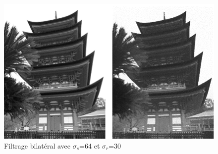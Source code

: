 \documentclass[twoside,UTF8]{EPURapport}
\begin{document}
\begin{figure}[H]
	\begin{center} 
		\includegraphics[]{images/IM088_64_30.png} 
	\end{center} 
	\caption{Filtrage bilatéral avec $\sigma_s$=64 et $\sigma_r$=30 }
\end{figure} 



\end{document}
